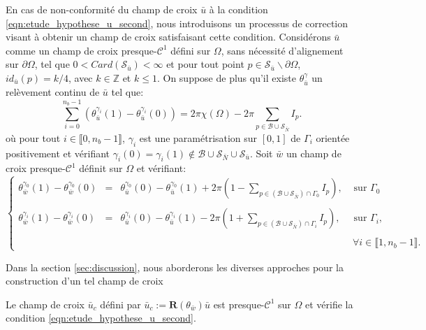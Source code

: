 En cas de non-conformité du champ de croix $\bar{u}$ à la condition \eqref{eqn:etude_hypothese_u_second}, nous introduisons un processus de correction visant à obtenir un champ de croix satisfaisant cette condition. Considérons $\bar{u}$ comme un champ de croix presque-$\mathcal{C}^1$ défini sur $\Omega$, sans nécessité d'alignement sur $\partial\Omega$, tel que $0<Card(\mathcal{S}_{\bar{u}})<\infty$ et pour tout point $p\in\mathcal{S}_{\bar{u}}\backslash\partial\Omega$, $id_{\bar{u}}(p)=k/4$, avec $k\in\mathbb{Z}$ et $k\leq 1$. On suppose de plus qu'il existe $\theta_{\bar{u}}^\gamma$ un relèvement continu de $\bar{u}$ tel que:
\begin{equation}
    \displaystyle\sum_{i=0}^{n_b-1}\left(\theta_{\bar{u}}^{\gamma_i}(1)-\theta_{\bar{u}}^{\gamma_i}(0)\right)=2\pi\chi(\Omega)-2\pi\sum_{p\in\mathcal{B}\cup\mathcal{S}_{\bar{N}}}I_p.
\end{equation}
où pour tout $i\in\llbracket0, n_b-1\rrbracket$, $\gamma_i$ est une paramétrisation sur $[0, 1]$ de $\Gamma_i$ orientée positivement et vérifiant $\gamma_i(0)=\gamma_i(1)\notin\mathcal{B}\cup\mathcal{S}_{\bar{N}}\cup\mathcal{S}_{\bar{u}}$.
Soit $\bar{w}$ un champ de croix presque-$\mathcal{C}^1$ définit sur $\Omega$ et vérifiant:
\begin{equation}
    \left\{
    \begin{array}{lcll}
    \theta_{\bar{w}}^{\gamma_0}(1)-\theta_{\bar{w}}^{\gamma_0}(0)&=&\theta_{\bar{u}}^{\gamma_0}(0)-\theta_{\bar{u}}^{\gamma_0}(1)+2\pi\left(1-\displaystyle\sum_{p\in(\mathcal{B}\cup\mathcal{S}_{\bar{N}})\cap\Gamma_0}I_p\right),&\mbox{ sur }\Gamma_0\\\\
    \theta_{\bar{w}}^{\gamma_i}(1)-\theta_{\bar{w}}^{\gamma_i}(0)&=&\theta_{\bar{u}}^{\gamma_i}(0)-\theta_{\bar{u}}^{\gamma_i}(1)-2\pi\left(1+\displaystyle\sum_{p\in(\mathcal{B}\cup\mathcal{S}_{\bar{N}})\cap\Gamma_i}I_p\right),&\mbox{ sur }\Gamma_i,\\\\
    &&&~\forall i\in\llbracket 1, n_b-1\rrbracket.
    \end{array}
    \right.
\end{equation}

Dans la section \ref{sec:discussion}, nous aborderons les diverses approches pour la construction d'un tel champ de croix

\begin{proposition}
    Le champ de croix $\bar{u}_c$ défini par $\bar{u}_c:=\mathbf{R}(\theta_{\bar{w}})\bar{u}$ est presque-$\mathcal{C}^1$ sur $\Omega$ et vérifie la condition \eqref{eqn:etude_hypothese_u_second}.
\end{proposition}


